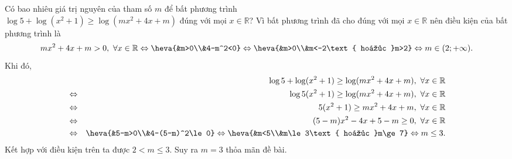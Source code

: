 \begin{bt}%
Có bao nhiêu giá trị nguyên của tham số $m$ để bất phương trình \\ $\log5+\log(x^2+1)\ge\log(mx^2+4x+m)$  đúng với mọi $x\in\mathbb{R}$?
\loigiai
{Vì bất phương trình đã cho đúng với mọi $x\in\mathbb{R}$ nên điều kiện của bất phương trình là
\[mx^2+4x+m>0,~\forall x\in\mathbb{R}\Leftrightarrow \heva{&m>0\\&4-m^2<0}\Leftrightarrow\heva{&m>0\\&m<-2\text{ hoặc }m>2}\Leftrightarrow m\in(2;+\infty).\]
Khi đó,
\allowdisplaybreaks
\begin{eqnarray*}
& &\log5+\log(x^2+1)\ge\log(mx^2+4x+m),~\forall x\in\mathbb{R}\\
&\Leftrightarrow & \log5(x^2+1)\ge\log(mx^2+4x+m),~\forall x\in\mathbb{R}\\
& \Leftrightarrow & 5(x^2+1)\ge mx^2+4x+m,~\forall x\in\mathbb{R}\\
& \Leftrightarrow & (5-m)x^2-4x+5-m\ge0,~\forall x\in\mathbb{R}\\
& \Leftrightarrow & \heva{&5-m>0\\&4-(5-m)^2\le0}\Leftrightarrow\heva{&m<5\\&m\le3\text{ hoặc }m\ge7}\Leftrightarrow m\le3.
\end{eqnarray*}
Kết hợp với điều kiện trên ta được $2<m\le3$. Suy ra $m=3$ thỏa mãn đề bài.
}
\end{bt}

